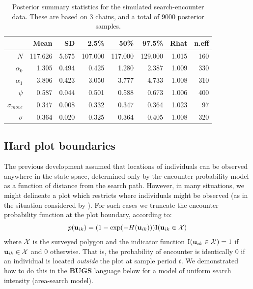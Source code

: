 \begin{table}[ht]
\caption{Posterior summary statistics for the simulated
  search-encounter data. These are based on 3 chains, 
and a total of 9000 posterior samples. 
}
\begin{tabular}{rrrrrrrr} \hline \hline
                & Mean     & SD     & 2.5\%    & 50\%     & 97.5\%   & Rhat  & n.eff \\ \hline
$N$             & 117.626  & 5.675  & 107.000  & 117.000  & 129.000  & 1.015 & 160   \\
$\alpha_0$      & 1.305    & 0.494  & 0.425    & 1.280    & 2.387    & 1.009 & 330   \\
$\alpha_1$      & 3.806    & 0.423  & 3.050    & 3.777    & 4.733    & 1.008 & 310   \\
$\psi$         & 0.587    & 0.044  & 0.501    & 0.588    & 0.673    & 1.006 & 400   \\
$\sigma_{move}$  & 0.347    & 0.008  & 0.332    & 0.347    & 0.364    & 1.023 & 97    \\
$\sigma$       & 0.364  &  0.020 &  0.325     &  0.364   & 0.405    & 1.008 & 320 \\ 
\end{tabular}
\label{searchencounter.tab.simtable}
\end{table}


\subsection{Hard plot boundaries}

The previous development assumed that locations of individuals can be
observed anywhere in the state-space, determined only by the encounter
probability model as a function of distance from the search path.
However, in many situations, we might delineate a plot which restricts
where individuals might be observed (as in the situation considered by
\citet{royle_young:2008}).  For such cases we truncate the encounter
probability function at the plot boundary, according to:
\begin{equation}
p({\bf u}_{ik}) = (1- \exp(-H({\bf u}_{ik}))) \mbox{I}({\bf u}_{ik} \in {\cal X})
\label{search-encounter.eq.hardplot}
\end{equation}
where ${\cal X}$ is the surveyed polygon and the indicator function
$\mbox{I}({\bf u}_{ik} \in {\cal X}) = 1$ if ${\bf u}_{ik} \in {\cal
  X}$ and 0 otherwise.  That is, the probability of encounter is
identically 0 if an individual is located {\it outside} the plot at
sample period $t$.  We demonstrated how to do this in the {\bf BUGS}
language below for a model of uniform search intensity (area-search
model).


